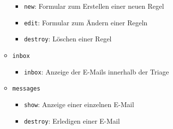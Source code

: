 \begin{itemize}
\begin{itemize}
\begin{itemize}
            \item \texttt{new}: Formular zum Erstellen einer neuen Regel
            \item \texttt{edit}: Formular zum Ändern einer Regeln
            \item \texttt{destroy}: Löschen einer Regel 
        \end{itemize}
        \item \texttt{inbox}
        \begin{itemize}
            \item \texttt{inbox}: Anzeige der E-Mails innerhalb der Triage
        \end{itemize}
        \item \texttt{messages}
        \begin{itemize}
            \item \texttt{show}: Anzeige einer einzelnen E-Mail  
            \item \texttt{destroy}: Erledigen einer E-Mail
        \end{itemize}
    \end{itemize}
\end{itemize}